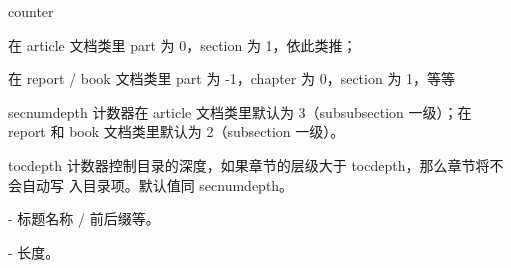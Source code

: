\documentclass[UTF8]{ctexart}
\begin{document}

	counter

	在 article 文档类里 part 为 0，section 为 1，依此类推；

	在 report / book 文档类里 part 为 -1，chapter 为 0，section 为 1，等等

	secnumdepth 计数器在 article 文档类里默认为 3（subsubsection 一级）；在 report 和 book
	文档类里默认为 2（subsection 一级）。

	tocdepth 计数器控制目录的深度，如果章节的层级大于 tocdepth，那么章节将不会自动写
	入目录项。默认值同 secnumdepth。


	- 标题名称 / 前后缀等。

	- 长度。
\end{document}
